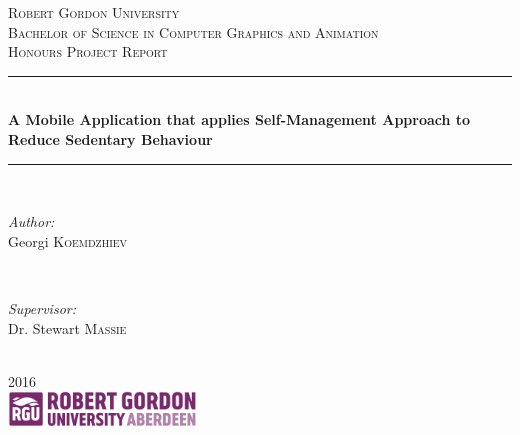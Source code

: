 \begin{titlepage}
  \newcommand{\HRule}{\rule{\linewidth}{0.5mm}}
  \center

  \textsc{\LARGE Robert Gordon University}\\[1.5cm]
  \textsc{\Large Bachelor of Science in Computer Graphics and Animation}\\[0.5cm]
  \textsc{\large Honours Project Report}\\[0.5cm]

  \HRule \\[0.4cm]
  { \huge \bfseries A Mobile Application that applies Self-Management Approach to Reduce Sedentary Behaviour}\\[0.4cm]
  \HRule \\[1.5cm]

  \begin{minipage}{0.4\textwidth}
  \begin{flushleft} \large
  \emph{Author:}\\
  Georgi \textsc{Koemdzhiev}
  \end{flushleft}
  \end{minipage}
  ~
  \begin{minipage}{0.4\textwidth}
  \begin{flushright} \large
  \emph{Supervisor:} \\
  Dr. Stewart \textsc{Massie}
  \end{flushright}
  \end{minipage}\\[4cm]

  {\large 2016}\\[3cm]

  \includegraphics[width=5cm, scale=0.1]{assets/rgu-logo.png}\\[1cm]
  \vfill
\end{titlepage}